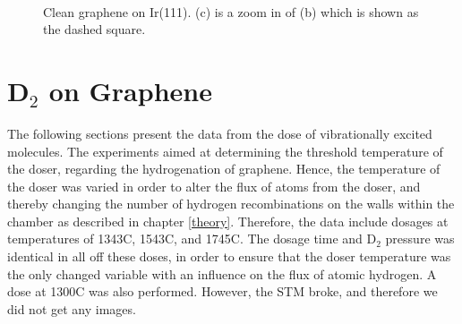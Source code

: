\begin{figure}[H]
  \\
\caption{Clean graphene on Ir(111). (c) is a zoom in of (b) which is shown as the dashed square.}
\label{GrIr}
\end{figure}

\section{D$_2$ on Graphene}

The following sections present the data from the dose of vibrationally excited molecules. The experiments aimed at determining the threshold temperature of the doser, regarding the hydrogenation of graphene. Hence, the temperature of the doser was varied in order to alter the flux of atoms from the doser, and thereby changing the number of hydrogen recombinations on the walls within the chamber as described in chapter \ref{theory}. Therefore, the data include dosages at temperatures of 1343\degree C, 1543\degree C, and 1745\degree C. The dosage time and D$_2$ pressure was identical in all off these doses, in order to ensure that the doser temperature was the only changed variable with an influence on the flux of atomic hydrogen. A dose at 1300\degree C was also performed. However, the STM broke, and therefore we did not get any images.


